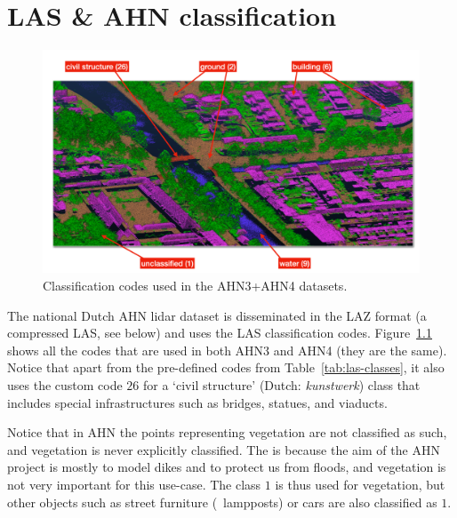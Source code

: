 
\graphicspath{{appendices/ahn/figs/}}

\chapter{LAS \& AHN classification}%
\label{app:ahn}


\begin{figure}
  \includegraphics[width=\linewidth]{ahn4.png}
  \caption{Classification codes used in the AHN3+AHN4 datasets.}%
\label{fig:ahn3}
\end{figure}
The national Dutch AHN lidar dataset 
is disseminated in the LAZ format (a compressed LAS, see below) and uses the LAS classification codes. 
Figure~\ref{fig:ahn3} shows all the codes that are used in both AHN3 and AHN4 (they are the same). 
Notice that apart from the pre-defined codes from Table~\ref{tab:las-classes}, it also uses the custom code $26$ for a `civil structure' (Dutch: \emph{kunstwerk}) class that includes special infrastructures such as bridges, statues, and viaducts. 

Notice that in AHN the points representing vegetation are not classified as such, and vegetation is never explicitly classified.
The is because the aim of the AHN project is mostly to model dikes and to protect us from floods, and vegetation is not very important for this use-case.
The class $1$ is thus used for vegetation, but other objects such as street furniture (\eg\ lampposts) or cars are also classified as $1$.



